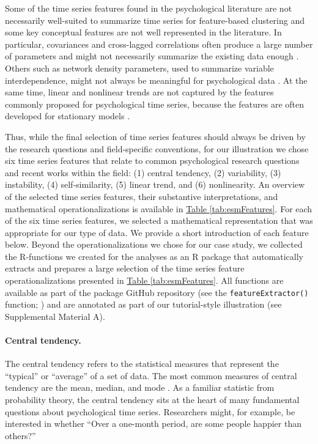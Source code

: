 \documentclass[man, 12pt, a4paper, floatsintext]{apa7}
\theoremstyle{break}
\theoremstyle{plain}
\newcommand{\tblref}[2][]{\hyperref[#2]{Table \ref*{#2}#1}}
\begin{document}
Some of the time series features found in the psychological literature are not necessarily well-suited to summarize time series for feature-based clustering and some key conceptual features are not well represented in the literature. In particular, covariances and cross-lagged correlations often produce a large number of parameters and might not necessarily summarize the existing data enough \citep{ernst2021}. Others such as network density parameters, used to summarize variable interdependence, might not always be meaningful for psychological data \citep{bringmann2019a}. At the same time, linear and nonlinear trends are not captured by the features commonly proposed for psychological time series, because the features are often developed for stationary models \citep[e.g.,][]{krone2018}. 

Thus, while the final selection of time series features should always be driven by the research questions and field-specific conventions, for our illustration we chose six time series features that relate to common psychological research questions and recent works within the field: (1) central tendency, (2) variability, (3) instability, (4) self-similarity, (5) linear trend, and (6) nonlinearity. An overview of the selected time series features, their substantive interpretations, and mathematical operationalizations is available in \tblref{tab:esmFeatures}. For each of the six time series features, we selected a mathematical representation that was appropriate for our type of data. We provide a short introduction of each feature below. Beyond the operationalizations we chose for our case study, we collected the R-functions we created for the analyses as an R package that automatically extracts and prepares a large selection of the time series feature operationalizations presented in \tblref{tab:esmFeatures}. All functions are available as part of the package GitHub repository (see the \texttt{featureExtractor()} function; \citealp{Kreienkamp2023-tsFeatureExtracR}) and are annotated as part of our tutorial-style illustration (see Supplemental Material A).



\paragraph{Central tendency.}

The central tendency refers to the statistical measures that represent
the ``typical'' or ``average'' of a set of data. The most common
measures of central tendency are the mean, median, and mode
\citep{weisberg1992}. As a familiar statistic from probability theory,
the central tendency sits at the heart of many fundamental questions
about psychological time series. Researchers might, for example, be
interested in whether ``Over a one-month period, are some people happier
than others?''
\end{document}
